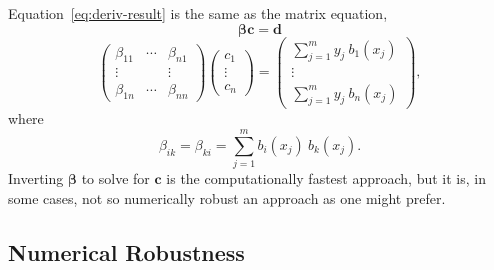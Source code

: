\documentclass[twocolumn]{article}
\begin{document}
Equation~\ref{eq:deriv-result} is the same as the matrix equation,
\begin{equation}
   \boldsymbol{\beta} \mathbf{c} = \mathbf{d}
   \label{eq:beta}
\end{equation}
\begin{equation}
   \begin{pmatrix}
      \beta_{11} & \cdots & \beta_{n1}\\
      \vdots & & \vdots\\
      \beta_{1n} & \cdots & \beta_{nn}
   \end{pmatrix}
   \begin{pmatrix}
      c_1\\
      \vdots\\
      c_n
   \end{pmatrix}
   =
   \begin{pmatrix}
      \sum_{j=1}^{m} y_j \: b_1(x_j)\\
      \vdots\\
      \sum_{j=1}^{m} y_j \: b_n(x_j)
   \end{pmatrix},
\end{equation}
where
\begin{equation}
   \beta_{ik} = \beta_{ki} = \sum_{j=1}^m b_i(x_j) \: b_k(x_j).
\end{equation}
Inverting $\boldsymbol{\beta}$ to solve for $\mathbf{c}$ is the computationally
fastest approach, but it is, in some cases, not so numerically robust an
approach as one might prefer.

\subsection{Numerical Robustness}
\end{document}
